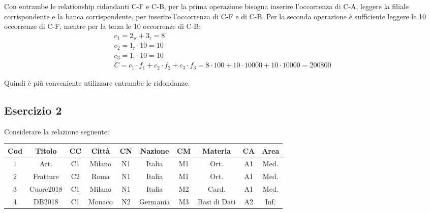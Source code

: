 \documentclass{article}
\numberwithin{equation}{subsection}
\begin{document}
Con entrambe le relationship ridondanti C-F e C-B, per la prima operazione bisogna inserire l'occorrenza di C-A, leggere la filiale corrispondente e la banca corrispondente, per inserire l'occorrenza di C-F e di C-B. Per la seconda operazione è sufficiente leggere le 10 occorrenze di C-F, mentre per la terza le 10 occorrenze di C-B:
\begin{gather*}
    c_1=2_\text{w}+3_\text{r}=8\\
    c_2=1_\text{r}\cdot10=10\\
    c_3=1_\text{r}\cdot10=10\\
    C=c_1\cdot f_1+c_2\cdot f_2+c_3\cdot f_3=8\cdot100+10\cdot10000+10\cdot10000=200800
\end{gather*}

Quindi è più conveniente utilizzare entrambe le ridondanze. 

\subsection{Esercizio 2}

Considerare la relazione seguente:

\begin{center}
    \begin{tabular}{|c|c|c|c|c|c|c|c|c|c|}
        \hline
        Cod & Titolo & CC & Città & CN & Nazione & CM & Materia & CA & Area\\
        \hline
        1 & Art. & C1 & Milano & N1 & Italia & M1&Ort.&A1&Med.\\
        \hline
        2&Fratture&C2&Roma&N1&Italia&M1&Ort.&A1&Med.\\\hline
        3&Cuore2018&C1&Milano&N1&Italia&M2&Card.&A1&Med.\\\hline
        4&DB2018&C1&Monaco&N2&Germania&M3&Basi di Dati&A2&Inf.\\\hline
    \end{tabular}
\end{center}
\end{document}
